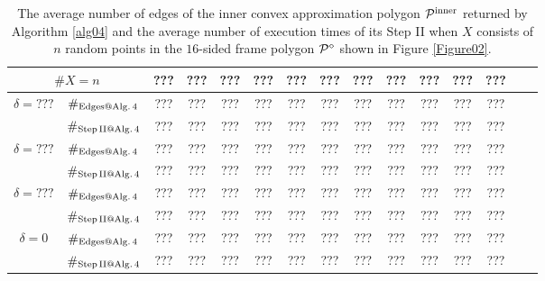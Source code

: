 \documentclass[12pt]{article}
\begin{document}
		\begin{table}[ht]
	\begin{center}\renewcommand{\arraystretch}{1.2}\small
		\setlength\tabcolsep{0.05cm}
		\begin{tabular}{|c|c||c|c|c|c|c|c|c|c|c|c|c|c|c|}
		\hline
		\multicolumn {2}{|c||}{\footnotesize $\#X=n$}  & ???& ???& ???& ???& ???& ???& ???& ???& ???& ???& ??? \\ 
		\hline		
		\hline
		\multirow{2}{*}{ $\delta = ???$}

        & $\#_{\rm Edges@ Alg.\, 4}$  &   ???& ???& ???& ???& ???& ???& ???& ???& ???& ???& ??? \\
        		
		& $\#_{\rm Step\, II @ Alg.\, 4}$& ???& ???& ???& ???& ???& ???& ???& ???& ???& ???& ???   \\
		\hline
		\multirow{2}{*}{ $\delta = ???$}

        & $\#_{\rm Edges@ Alg.\, 4}$  &   ???& ???& ???& ???& ???& ???& ???& ???& ???& ???& ??? \\
        		
		& $\#_{\rm Step\, II @ Alg.\, 4}$& ???& ???& ???& ???& ???& ???& ???& ???& ???& ???& ???   \\
		\hline
		\multirow{2}{*}{ $\delta = ???$}

        & $\#_{\rm Edges@ Alg.\, 4}$  &   ???& ???& ???& ???& ???& ???& ???& ???& ???& ???& ??? \\
        		
		& $\#_{\rm Step\, II @ Alg.\, 4}$& ???& ???& ???& ???& ???& ???& ???& ???& ???& ???& ???   \\
		\hline
		\multirow{2}{*}{ $\delta = 0$}

        & $\#_{\rm Edges@ Alg.\, 4}$  &   ???& ???& ???& ???& ???& ???& ???& ???& ???& ???& ??? \\
        		
		& $\#_{\rm Step\, II @ Alg.\, 4}$& ???& ???& ???& ???& ???& ???& ???& ???& ???& ???& ???   \\
		\hline
	\end{tabular}
		\caption{The average number of edges of the inner convex approximation polygon ${\cal P}^{\rm inner}$ returned by Algorithm \ref{alg04} and the average number of execution times of its Step II when $X$ consists of $n$ random points in the $16$-sided frame polygon ${\cal P}^\diamond$ shown in Figure \ref{Figure02}.}
		\label{table03}
	\end{center}
\end{table} 	
\end{document}
